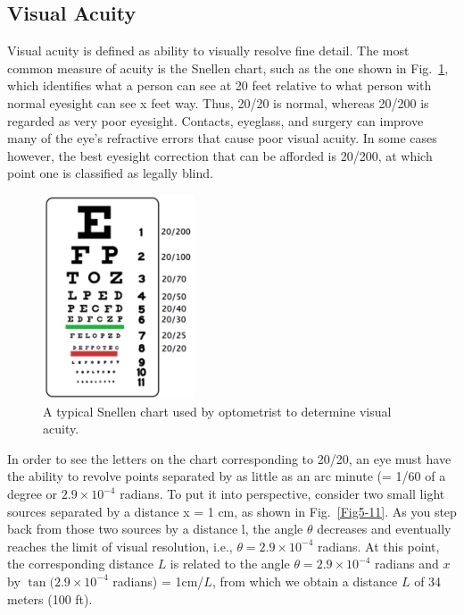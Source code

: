 \subsection{Visual Acuity}

Visual acuity is defined as ability to visually resolve fine detail. The most common measure of acuity is the Snellen chart, such as the one shown in Fig.~\ref{Fig5-10}, which identifies what a person can see at 20 feet relative to what person with normal eyesight can see x feet way. Thus, 20/20 is normal, whereas 20/200 is regarded as very poor eyesight. Contacts, eyeglass, and surgery can improve many of the eye’s refractive errors that cause poor visual acuity. In some cases however, the best eyesight correction that can be afforded is 20/200, at which point one is classified as legally blind.
\begin{figure} 
\vspace{-20pt}
  \begin{center}
    \includegraphics[width=0.4\textwidth]{./figures/Topic5/Fig5-10.png}
    \caption{A typical Snellen chart used by optometrist to determine visual acuity.}
    \label{Fig5-10}
  \end{center}
  \vspace{0.25in}
\end{figure}

In order to see the letters on the chart corresponding to 20/20, an eye must have the ability to revolve points separated by as little as an arc minute (= 1/60 of a degree or $2.9\times10^{-4}$ radians. To put it into perspective, consider two small light sources separated by a distance x = 1 cm, as shown in Fig.~\ref{Fig5-11}. As you step back from those two sources by a distance l, the angle $\theta$ decreases and eventually reaches the limit of visual resolution, i.e.,  $\theta = 2.9\times10^{-4}$ radians. At this point, the corresponding distance $L$ is related to the angle $\theta = 2.9\times10^{-4}$ radians and $x$ by $\tan(2.9\times10^{-4}$ radians) = 1cm/$L$, from which we obtain a distance $L$ of 34 meters (100 ft). 


